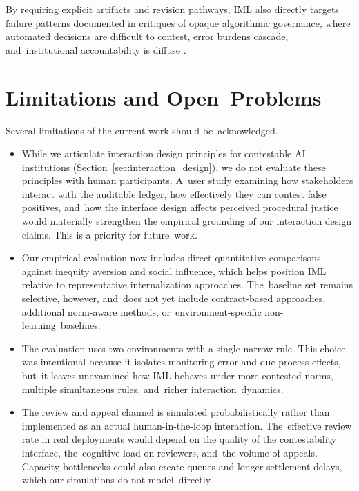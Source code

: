 \documentclass[mca,article,accept,pdftex,oneauthor]{Definitions/mdpi}
\begin{document}
By requiring explicit artifacts and revision pathways, IML also directly targets failure patterns documented in critiques of opaque algorithmic governance, where automated decisions are difficult to contest, error burdens cascade, and~institutional accountability is diffuse \citep{ONeil2016WMD,Eubanks2018AutomatingInequality}.


\section{Limitations and Open~Problems}
\label{sec:limits}

Several limitations of the current work should be~acknowledged.

\begin{itemize}
    \item While we articulate interaction design principles for contestable AI institutions (Section~\ref{sec:interaction_design}), we do not evaluate these principles with human participants. A~user study examining how stakeholders interact with the auditable ledger, how effectively they can contest false positives, and~how the interface design affects perceived procedural justice would materially strengthen the empirical grounding of our interaction design claims. This is a priority for future~work.

    \item Our empirical evaluation now includes direct quantitative comparisons against inequity aversion and social influence, which helps position IML relative to representative internalization approaches. The~baseline set remains selective, however, and~does not yet include contract-based approaches, additional norm-aware methods, or~environment-specific non-learning~baselines.

    \item The evaluation uses two environments with a single narrow rule. This choice was intentional because it isolates monitoring error and due-process effects, but~it leaves unexamined how IML behaves under more contested norms, multiple simultaneous rules, and~richer interaction~dynamics.%

    \item The review and appeal channel is simulated probabilistically rather than implemented as an actual human-in-the-loop interaction. The~effective review rate in real deployments would depend on the quality of the contestability interface, the~cognitive load on reviewers, and~the volume of appeals. Capacity bottlenecks could also create queues and longer settlement delays, which our simulations do not model~directly.


\end{itemize}
\end{document}

